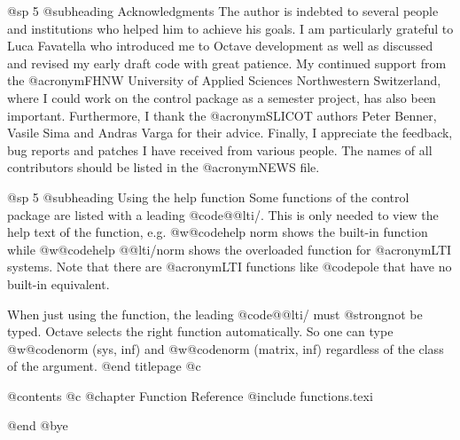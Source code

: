 @sp 5
@subheading Acknowledgments
The author is indebted to several people and institutions who helped
him to achieve his goals. I am particularly grateful to Luca Favatella
who introduced me to Octave development as well as discussed and revised
my early draft code with great patience. My continued support from the
@acronym{FHNW} University of Applied Sciences Northwestern Switzerland,
where I could work on the control package as a semester project, has also
been important. Furthermore, I thank the @acronym{SLICOT} authors
Peter Benner, Vasile Sima and Andras Varga for their advice.
Finally, I appreciate the feedback, bug reports and patches I have received
from various people. The names of all contributors should be listed in the
@acronym{NEWS} file.


@sp 5
@subheading Using the help function
Some functions of the control package are listed with a leading @code{@@lti/}.
This is only needed to view the help text of the function, e.g. @w{@code{help norm}}
shows the built-in function while @w{@code{help @@lti/norm}} shows the overloaded
function for @acronym{LTI} systems. Note that there are @acronym{LTI} functions
like @code{pole} that have no built-in equivalent.

When just using the function, the leading @code{@@lti/} must @strong{not} be typed.
Octave selects the right function automatically. So one can type @w{@code{norm (sys, inf)}}
and @w{@code{norm (matrix, inf)}} regardless of the class of the argument.
@end titlepage
@c %

@contents
@c @chapter Function Reference
@include functions.texi

@end
@bye
